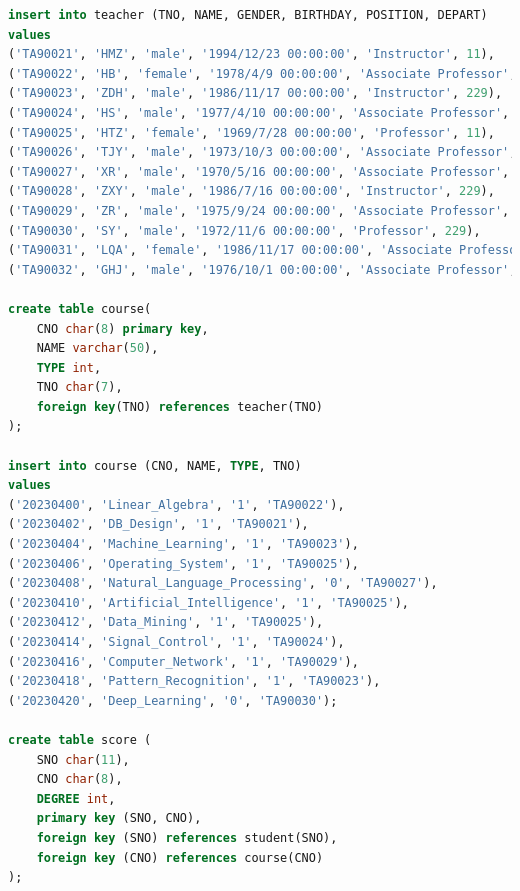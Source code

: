 \documentclass{ctexart}
\begin{document}
\begin{lstlisting}[language=sql]
insert into teacher (TNO, NAME, GENDER, BIRTHDAY, POSITION, DEPART)  
values
('TA90021', 'HMZ', 'male', '1994/12/23 00:00:00', 'Instructor', 11),
('TA90022', 'HB', 'female', '1978/4/9 00:00:00', 'Associate Professor', 10),
('TA90023', 'ZDH', 'male', '1986/11/17 00:00:00', 'Instructor', 229),
('TA90024', 'HS', 'male', '1977/4/10 00:00:00', 'Associate Professor', 6),
('TA90025', 'HTZ', 'female', '1969/7/28 00:00:00', 'Professor', 11),
('TA90026', 'TJY', 'male', '1973/10/3 00:00:00', 'Associate Professor', 12),
('TA90027', 'XR', 'male', '1970/5/16 00:00:00', 'Associate Professor', 11),
('TA90028', 'ZXY', 'male', '1986/7/16 00:00:00', 'Instructor', 229),
('TA90029', 'ZR', 'male', '1975/9/24 00:00:00', 'Associate Professor', 11),
('TA90030', 'SY', 'male', '1972/11/6 00:00:00', 'Professor', 229),
('TA90031', 'LQA', 'female', '1986/11/17 00:00:00', 'Associate Professor', 10),
('TA90032', 'GHJ', 'male', '1976/10/1 00:00:00', 'Associate Professor', 18);

create table course(
	CNO char(8) primary key,   
	NAME varchar(50),   
	TYPE int,   
	TNO char(7),  
	foreign key(TNO) references teacher(TNO)  
);  
    
insert into course (CNO, NAME, TYPE, TNO)
values
('20230400', 'Linear_Algebra', '1', 'TA90022'),
('20230402', 'DB_Design', '1', 'TA90021'),
('20230404', 'Machine_Learning', '1', 'TA90023'),
('20230406', 'Operating_System', '1', 'TA90025'),
('20230408', 'Natural_Language_Processing', '0', 'TA90027'),
('20230410', 'Artificial_Intelligence', '1', 'TA90025'),
('20230412', 'Data_Mining', '1', 'TA90025'),
('20230414', 'Signal_Control', '1', 'TA90024'),
('20230416', 'Computer_Network', '1', 'TA90029'),
('20230418', 'Pattern_Recognition', '1', 'TA90023'),
('20230420', 'Deep_Learning', '0', 'TA90030');

create table score (  
    SNO char(11),  
    CNO char(8),  
    DEGREE int,  
    primary key (SNO, CNO),  
    foreign key (SNO) references student(SNO),  
    foreign key (CNO) references course(CNO)  
);



\end{lstlisting}
\end{document}
